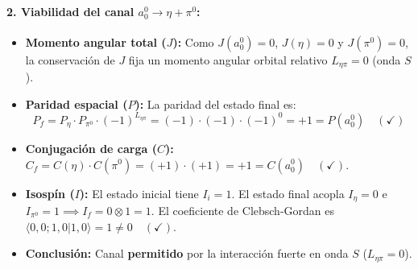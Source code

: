 \begin{problema}
\paragraph{2. Viabilidad del canal $a_0^0 \to \eta + \pi^0$:}
\begin{itemize}
    \item \textbf{Momento angular total ($J$):} Como $J(a_0^0) = 0$, $J(\eta) = 0$ y $J(\pi^0) = 0$, la conservación de $J$ fija un momento angular orbital relativo $L_{\eta\pi} = 0$ (onda $S$).
    \item \textbf{Paridad espacial ($P$):} La paridad del estado final es:
    \begin{equation*}
        P_f = P_\eta \cdot P_{\pi^0} \cdot (-1)^{L_{\eta\pi}} = (-1) \cdot (-1) \cdot (-1)^0 = +1 = P(a_0^0) \quad (\checkmark)
    \end{equation*}
    \item \textbf{Conjugación de carga ($C$):} $C_f = C(\eta) \cdot C(\pi^0) = (+1) \cdot (+1) = +1 = C(a_0^0) \quad (\checkmark)$.
    \item \textbf{Isospín ($I$):} El estado inicial tiene $I_i = 1$. El estado final acopla $I_\eta = 0$ e $I_{\pi^0} = 1 \implies I_f = 0 \otimes 1 = 1$. El coeficiente de Clebsch-Gordan es $\langle 0, 0; 1, 0 | 1, 0 \rangle = 1 \neq 0 \quad (\checkmark)$.
    \item \textbf{Conclusión:} Canal \textbf{permitido} por la interacción fuerte en onda $S$ ($L_{\eta\pi} = 0$).
\end{itemize}
\end{problema}
\newpage
